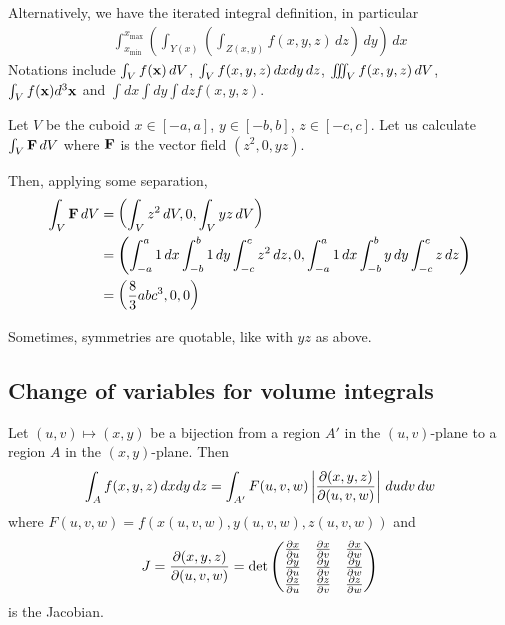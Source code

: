 \documentclass{../template/note}
\begin{document}
    Alternatively, we have the iterated integral definition, in particular
    \begin{align*}
        \int_{x_{\min}}^{x_\text{max}}\left(\int_{Y(x)}\left(\int_{Z(x,y)}f(x, y, z) \, dz\right) \, dy\right) \, dx
    \end{align*}
    Notations include \(\int_V f(\V x) \D V\), \(\int_V f(x, y, z) \,d{x} dy \, dz\), \(\iiint_V f(x, y, z) \,d{V}\), \(\int_V f(\V x) d^3 \V x\) and \(\int dx \int dy \int dz f(x, y, z)\).

    \begin{example*}
        Let \(V\) be the cuboid \(x \in [-a, a]\), \(y \in [-b, b]\), \(z \in [-c, c]\). Let us calculate \(\int_V \V F \D V\) where \(\V F\) is the vector field \((z^2, 0, yz)\).

        Then, applying some separation,
        \begin{align*}
            \int_V \V F \D V &= \left(\int_V z^2 \D V, 0, \int_V yz \D V\right) \\
            &= \left(\int_{-a}^a 1 \D x \int_{-b}^b 1 \D y \int_{-c}^c z^2 \D z, 0, \int_{-a}^a 1 \D x \int_{-b}^b y \D y \int_{-c}^c z \D z\right) \\
            &= \left(\frac 8 3 abc^3, 0, 0\right)
        \end{align*}
    \end{example*}
    
    \begin{remark*}
        Sometimes, symmetries are quotable, like with \(yz\) as above.
    \end{remark*}
    
    \subsection{Change of variables for volume integrals}
    
    \begin{proposition*}
        Let \((u, v) \mapsto (x, y)\) be a bijection from a region \(A'\) in the \((u, v)\)-plane to a region \(A\) in the \((x, y)\)-plane. Then
        \begin{align*}
            \int_A f(x, y, z) \D x dy \, dz = \int_{A'} F(u, v, w) \left|\pd{(x,y,z)}{(u, v,w)}\right| \D u dv \, dw \\
        \end{align*}
        where \(F(u, v, w) = f(x(u, v, w), y(u, v, w), z(u, v, w))\) and
        \begin{align*}
            J = \pd{(x,y,z)}{(u, v,w)} = \det \begin{pmatrix}
            \pd x u & \pd x v & \pd x w \\
            \pd y u & \pd y v & \pd y w \\
            \pd z u & \pd z v & \pd z w
            \end{pmatrix}
        \end{align*}
        is the Jacobian.
    \end{proposition*}
    
\end{document}

